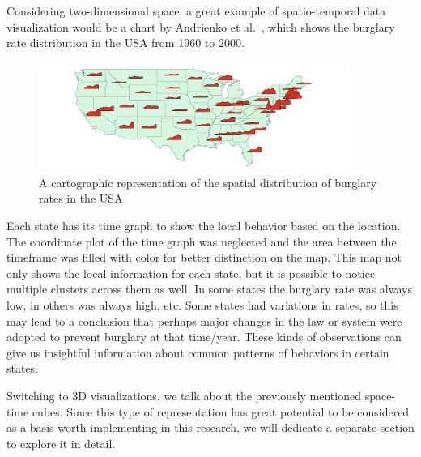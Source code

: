 Considering two-dimensional space, a great example of spatio-temporal data visualization would be a chart by
Andrienko et al.~\citep{andrienko2005visual}, which shows the burglary rate distribution in the USA from 1960 to 2000.

\begin{figure}[hbt!]
    \begin{center}
        \includegraphics[width=0.9\textwidth]{graphics/2-literature-review/7}
    \end{center}
    \caption{A cartographic representation of the spatial distribution of burglary rates in the USA}
    \label{fig:figure2.7}
\end{figure}

Each state has its time graph to show the local behavior based on the location. The coordinate plot of the time
graph was neglected and the area between the timeframe was filled with color for better distinction on the map. This
map not only shows the local information for each state, but it is possible to notice multiple clusters across them as well.
In some states the burglary rate was always low, in others was always high, etc. Some states had variations in rates,
so this may lead to a conclusion that perhaps major changes in the law or system were adopted to prevent burglary at that time/year.
These kinds of observations can give us insightful information about common patterns of behaviors in certain states.

Switching to 3D visualizations, we talk about the previously mentioned space-time cubes. Since this type of representation
has great potential to be considered as a basis worth implementing in this research, we will dedicate a separate section
to explore it in detail.
